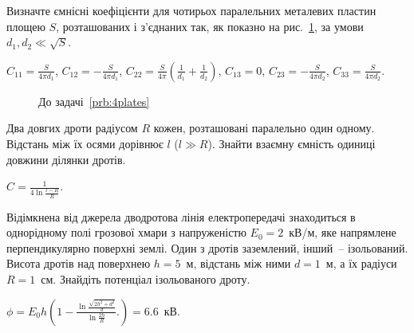\begin{problem}\label{prb:4plates}%
    Визначте ємнісні коефіцієнти для чотирьох паралельних металевих пластин площею $S$, розташованих і з'єднаних так,
як показно на рис.~\ref{4plates}, за умови $d_1, d_2 \ll \sqrt{S}$.
\begin{solution}
	$C_{11} = \frac{S}{4\pi d_1}$, $C_{12} = -\frac{S}{4\pi d_1}$, $C_{22} = \frac{S}{4\pi}\left( \frac{1}{d_1} + \frac{1}{d_2} \right) $, $C_{13} = 0$, $C_{23} = -\frac{S}{4\pi d_2}$, $C_{33} = \frac{S}{4\pi d_2}$.
\end{solution}
\end{problem}
\begin{figure}[h!]\centering
\caption{До задачі~\ref{prb:4plates}}
\label{4plates}
\end{figure}



\begin{problem}
Два довгих дроти радіусом $R$ кожен, розташовані паралельно один одному. Відстань між їх осями дорівнює $l$ ($l \gg R$). Знайти взаємну ємність одиниці довжини ділянки дротів.
\begin{solution}
	$C = \frac{1}{4\ln\frac{l - R}{R}}$.
\end{solution}
\end{problem}

\begin{problem}%
Відімкнена від джерела дводротова лінія електропередачі знаходиться в однорідному полі грозової хмари з напруженістю $E_0 = 2$~кВ/м, яке напрямлене перпендикулярно поверхні землі. Один з дротів заземлений, інший~-- ізольований. Висота дротів над поверхнею $h = 5$~м, відстань між ними $d = 1$~м, а їх радіуси $R = 1$~см. Знайдіть потенціал ізольованого дроту.
\begin{solution}
	$\phi = E_0 h \left( 1 - \frac{\ln\frac{\sqrt{2h^2 + d^2}}{d}}{\ln\frac{2h}{R}}. \right) = 6.6$~кВ.
\end{solution}
\end{problem}


